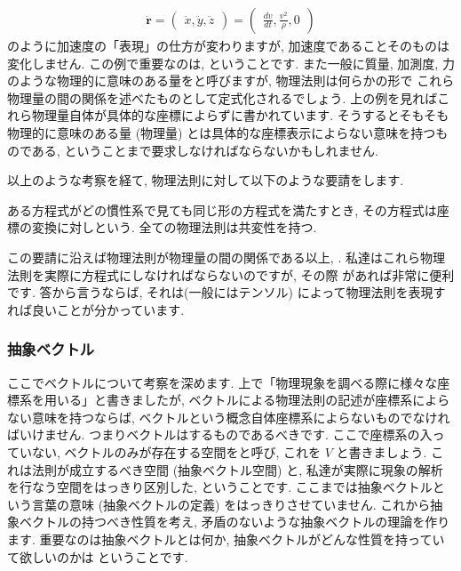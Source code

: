 \documentclass[openany, a4paper, oneside]{jsbook}
\begin{document}
\begin{align}
    \ddot{ \bm {r} }
    =
    \begin{pmatrix}
        \ddot{x},\ddot{y},\ddot{z}
    \end{pmatrix}
    =
    \begin{pmatrix}
        \frac{d v} {dt},\frac{v^2} {\rho },0
    \end{pmatrix}
\end{align}
のように加速度の「表現」の仕方が変わりますが, 加速度であることそのものは変化しません.
この例で重要なのは, ということです.
また一般に質量, 加測度, 力のような物理的に意味のある量をと呼びますが, 物理法則は何らかの形で
これら物理量の間の関係を述べたものとして定式化されるでしょう.
上の例を見ればこれら物理量自体が具体的な座標によらずに書かれています.
そうするとそもそも物理的に意味のある量 (物理量) とは具体的な座標表示によらない意味を持つものである,
ということまで要求しなければならないかもしれません.

以上のような考察を経て, 物理法則に対して以下のような要請をします.
\begin{req}
ある方程式がどの慣性系で見ても同じ形の方程式を満たすとき,
その方程式は座標の変換に対しという.
全ての物理法則は共変性を持つ.
\end{req}
この要請に沿えば物理法則が物理量の間の関係である以上, .
私達はこれら物理法則を実際に方程式にしなければならないのですが, その際
があれば非常に便利です.
答から言うならば, それは(一般にはテンソル) によって物理法則を表現すれば良いことが分かっています.
\subsubsection{抽象ベクトル}

ここでベクトルについて考察を深めます.
上で「物理現象を調べる際に様々な座標系を用いる」と書きましたが,
ベクトルによる物理法則の記述が座標系によらない意味を持つならば,
ベクトルという概念自体座標系によらないものでなければいけません.
つまりベクトルはするものであるべきです.
ここで座標系の入っていない, ベクトルのみが存在する空間をと呼び,
これを $V$ と書きましょう.
これは法則が成立するべき空間 (抽象ベクトル空間) と,
私達が実際に現象の解析を行なう空間をはっきり区別した, ということです.
ここまでは抽象ベクトルという言葉の意味 (抽象ベクトルの定義) をはっきりさせていません.
これから抽象ベクトルの持つべき性質を考え, 矛盾のないような抽象ベクトルの理論を作ります.
重要なのは抽象ベクトルとは何か, 抽象ベクトルがどんな性質を持っていて欲しいのかは
ということです.
\end{document}
